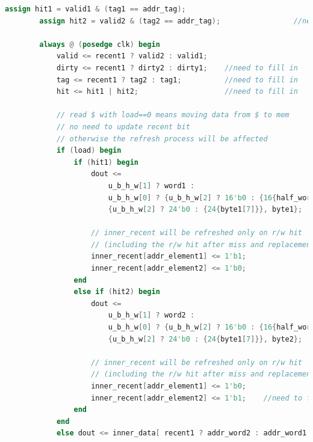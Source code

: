 \begin{lstlisting}[language = {verilog}]
        assign hit1 = valid1 & (tag1 == addr_tag);
        assign hit2 = valid2 & (tag2 == addr_tag);                 //need to fill in
    
        always @ (posedge clk) begin
            valid <= recent1 ? valid2 : valid1;
            dirty <= recent1 ? dirty2 : dirty1;    //need to fill in
            tag <= recent1 ? tag2 : tag1;          //need to fill in
            hit <= hit1 | hit2;                    //need to fill in
            
            // read $ with load==0 means moving data from $ to mem
            // no need to update recent bit
            // otherwise the refresh process will be affected
            if (load) begin
                if (hit1) begin
                    dout <=
                        u_b_h_w[1] ? word1 :
                        u_b_h_w[0] ? {u_b_h_w[2] ? 16'b0 : {16{half_word1[15]}}, half_word1} :
                        {u_b_h_w[2] ? 24'b0 : {24{byte1[7]}}, byte1};
                    
                    // inner_recent will be refreshed only on r/w hit
                    // (including the r/w hit after miss and replacement)
                    inner_recent[addr_element1] <= 1'b1;
                    inner_recent[addr_element2] <= 1'b0;
                end
                else if (hit2) begin
                    dout <=
                        u_b_h_w[1] ? word2 :
                        u_b_h_w[0] ? {u_b_h_w[2] ? 16'b0 : {16{half_word2[15]}}, half_word2} :
                        {u_b_h_w[2] ? 24'b0 : {24{byte1[7]}}, byte2};
                    
                    // inner_recent will be refreshed only on r/w hit
                    // (including the r/w hit after miss and replacement)
                    inner_recent[addr_element1] <= 1'b0;
                    inner_recent[addr_element2] <= 1'b1;    //need to fill in
                end
            end
            else dout <= inner_data[ recent1 ? addr_word2 : addr_word1 ];
    

\end{lstlisting}
